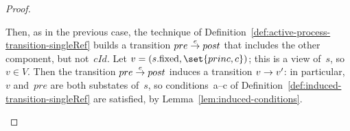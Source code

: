 \begin{proof}
\begin{enumerate}
Then, as in the previous case, the technique of
Definition~\ref{def:active-process-transition-singleRef} builds a transition
\( pre \stackrel{e}\rightarrow post \) that includes the other component, but not~$cId$.
%
Let $v = (s.\fixed, \set{princ, c})$; this is a view of~$s$, so $v \in V$.
Then the transition \( pre \stackrel{e}\rightarrow post \) induces a transition $v \stackrel{}\rightarrow
v'$: in particular, $v$ and~$pre$ are both substates of~$s$, so
conditions~a--c of Definition~\ref{def:induced-transition-singleRef} are
satisfied, by Lemma~\ref{lem:induced-conditions}.











\end{enumerate}
\end{proof}
